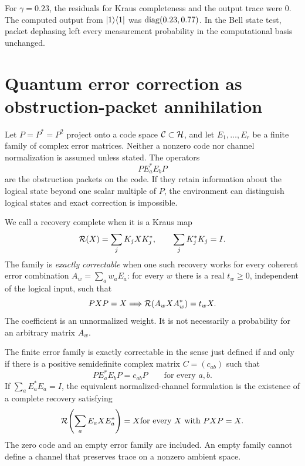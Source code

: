 \begin{certificate}\label{core:certificate:007}
For $\gamma=0.23$, the residuals for Kraus completeness and the output trace were $0$. The computed output from $\lvert 1\rangle\langle 1\rvert$ was $\operatorname{diag}(0.23,0.77)$. In the Bell state test, packet dephasing left every measurement probability in the computational basis unchanged.
\end{certificate}

\section{Quantum error correction as obstruction-packet annihilation}\label{core:section:008}

Let $P=P^*=P^2$ project onto a code space $\cC\subset\cH$, and let $E_1,\ldots,E_r$ be a finite family of complex error matrices. Neither a nonzero code nor channel normalization is assumed unless stated. The operators
\[
P E_a^*E_bP
\]
are the obstruction packets on the code. If they retain information about the logical state beyond one scalar multiple of $P$, the environment can distinguish logical states and exact correction is impossible.

We call a recovery complete when it is a Kraus map
\[
\cR(X)=\sum_jK_jXK_j^*,\qquad \sum_jK_j^*K_j=I.
\]
The family is \emph{exactly correctable} when one such recovery works for every coherent error combination $A_w=\sum_aw_aE_a$: for every $w$ there is a real $t_w\ge0$, independent of the logical input, such that
\[
PXP=X\quad\Longrightarrow\quad
\cR(A_wXA_w^*)=t_wX.
\]
The coefficient is an unnormalized weight. It is not necessarily a probability for an arbitrary matrix $A_w$.

\begin{classical}\label{core:classical:003}\label{core:thm:kl}
The finite error family is exactly correctable in the sense just defined if and only if there is a positive semidefinite complex matrix $C=(c_{ab})$ such that
\[
\boxed{PE_a^*E_bP=c_{ab}P\qquad\text{for every }a,b.}
\]
If $\sum_aE_a^*E_a=I$, the equivalent normalized-channel formulation is the existence of a complete recovery satisfying
\[
\cR\!\left(\sum_aE_aXE_a^*\right)=X
\quad\text{for every }X\text{ with }PXP=X.
\]
The zero code and an empty error family are included. An empty family cannot define a channel that preserves trace on a nonzero ambient space.
\end{classical}

